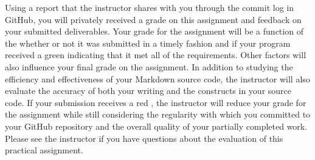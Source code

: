 \documentclass[11pt]{article}
\newcommand{\checkmark}{\ding{51}}
\newcommand{\naughtmark}{\ding{55}}
\begin{document}
Using a report that the instructor shares with you through the commit log in GitHub, you will privately received a grade
on this assignment and feedback on your submitted deliverables. Your grade for the assignment will be a function of the
whether or not it was submitted in a timely fashion and if your program received a green \checkmark{} indicating that it
met all of the requirements. Other factors will also influence your final grade on the assignment. In addition to
studying the efficiency and effectiveness of your Markdown source code, the instructor will also evaluate the accuracy of
both your writing and the constructs in your source code. If your submission receives a red \naughtmark{}, the
instructor will reduce your grade for the assignment while still considering the regularity with which you committed to
your GitHub repository and the overall quality of your partially completed work. Please see the instructor if you have
questions about the evaluation of this practical assignment.


\end{document}
